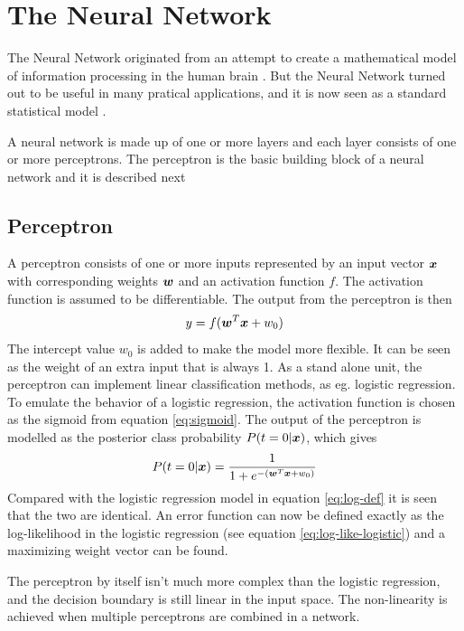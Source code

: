 \section{The Neural Network}\label{sec:feed-forward-neural-network}
The Neural Network originated from an attempt to create a mathematical model of information processing in the human brain \citep[p.226]{bishop}. But the Neural Network turned out to be useful in many pratical applications, and it is now seen as a standard statistical model \citep[p.392]{hastie09}. \par
A neural network is made up of one or more layers and each layer consists of one or more perceptrons. The perceptron is the basic building block of a neural network and it is described next

\subsection{Perceptron}
A perceptron consists of one or more inputs represented by an input vector $\boldsymbol{x}$ with corresponding weights $\boldsymbol{w}$ and an activation function $f$. The activation function is assumed to be differentiable. The output from the perceptron is then
\[
    y = f(\boldsymbol{w}^T\boldsymbol{x} + w_0)
\]
The intercept value $w_0$ is added to make the model more flexible. It can be seen as the weight of an extra input that is always 1.
As a stand alone unit, the perceptron can implement linear classification methods, as eg. logistic regression. To emulate the behavior of a logistic regression, the activation function is chosen as the sigmoid from equation \eqref{eq:sigmoid}. The output of the perceptron is modelled as the posterior class probability $P(t=0|\boldsymbol{x})$, which gives
\[
    P(t=0|\boldsymbol{x}) = \frac{1}{1+e^{-(\boldsymbol{w}^T\boldsymbol{x}+w_0)}}
\]
Compared with the logistic regression model in equation \eqref{eq:log-def} it is seen that the two are identical. An error function can now be defined exactly as the log-likelihood in the logistic regression (see equation \eqref{eq:log-like-logistic}) and a maximizing weight vector can be found. \par
The perceptron by itself isn't much more complex than the logistic regression, and the decision boundary is still linear in the input space. The non-linearity is achieved when multiple perceptrons are combined in a network.

